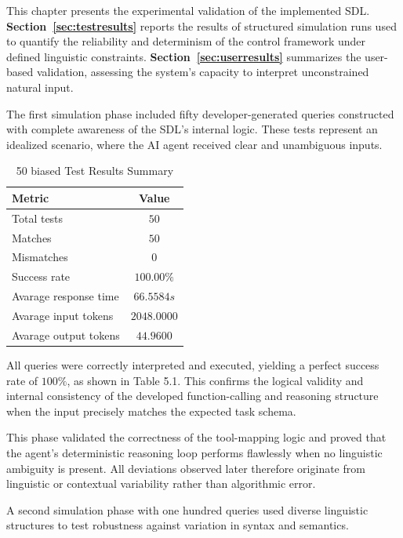 
This chapter presents the experimental validation of the implemented SDL. \textbf{Section~\ref{sec:testresults}} reports the results of structured simulation runs used to quantify the reliability and determinism of the control framework under defined linguistic constraints. \textbf{Section~\ref{sec:userresults}} summarizes the user-based validation, assessing the system’s capacity to interpret unconstrained natural input.


The first simulation phase included fifty developer-generated queries constructed with complete awareness of the SDL’s internal logic. These tests represent an idealized scenario, where the AI agent received clear and unambiguous inputs.  

\begin{table}[H]
\centering
\caption{50 biased Test Results Summary}
\begin{tabular}{l c}
\hline
\textbf{Metric} & \textbf{Value} \\ \hline
Total tests     & $50$ \\
Matches & $50$ \\
Mismatches      & $0$ \\
Success rate    & $100.00\%$ \\ 
Avarage response time & $66.5584s$ \\
Avarage input tokens    & $2048.0000$ \\ 
Avarage output tokens    & $44.9600$ \\ \hline
\end{tabular}
\end{table}

All queries were correctly interpreted and executed, yielding a perfect success rate of $100\%$, as shown in Table 5.1.  
This confirms the logical validity and internal consistency of the developed function-calling and reasoning structure when the input precisely matches the expected task schema.

This phase validated the correctness of the tool-mapping logic and proved that the agent’s deterministic reasoning loop performs flawlessly when no linguistic ambiguity is present.  
All deviations observed later therefore originate from linguistic or contextual variability rather than algorithmic error.

A second simulation phase with one hundred queries used diverse linguistic structures to test robustness against variation in syntax and semantics.  


